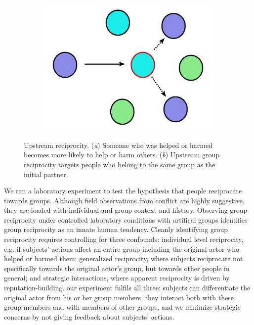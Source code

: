 \documentclass[12pt,a4paper]{article}\usepackage[]{graphicx}\usepackage[]{color}
\begin{document}
\begin{figure}
\begin{center}
\begin{subfigure}[b]{0.4\textwidth}
		  \includegraphics[width=\textwidth]{group.pdf}
            \caption{}\label{group}
        \end{subfigure}
        \caption{Upstream reciprocity. (\textit{a}) Someone who was helped or harmed becomes more likely to help or harm others. (\textit{b})
    Upstream group reciprocity targets people who belong to
    the same group as the initial partner.}
        \label{fig:illustration}
	\end{center}
\end{figure}

We ran a laboratory experiment to test the hypothesis that people reciprocate towards groups. Although field observations from conflict are highly suggestive, they are loaded with individual and group context and history. Observing group reciprocity under controlled laboratory conditions with artifical groups identifies group reciprocity as an innate human tendency.
Cleanly identifying group reciprocity requires controlling for three confounds: individual level reciprocity, e.g. if subjects' actions affect an entire group including the original actor who helped or harmed them; generalized reciprocity, where subjects reciprocate not specifically towards the original actor’s group, but towards other people in general; and strategic interactions, where apparent reciprocity is driven by reputation-building. 
our experiment fulfils all three: subjects can differentiate the original actor from his or her group members, they interact both with these group members and with members of other groups, and we minimize strategic concerns by not giving feedback about subjects' actions.
\end{document}
